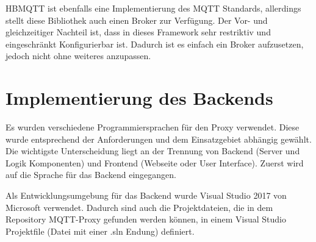     HBMQTT ist ebenfalls eine Implementierung des \ac{MQTT} Standards, allerdings stellt diese Bibliothek auch einen Broker zur Verfügung. Der Vor- und gleichzeitiger Nachteil ist, dass in dieses Framework sehr restriktiv und eingeschränkt Konfigurierbar ist. Dadurch ist es einfach ein Broker aufzusetzen, jedoch nicht ohne weiteres anzupassen.
    \cite{jouanin_2018}
    
\section{Implementierung des Backends}

    Es wurden verschiedene Programmiersprachen für den Proxy verwendet. Diese wurde entsprechend der Anforderungen und dem Einsatzgebiet abhängig gewählt.
    Die wichtigste Unterscheidung liegt an der Trennung von Backend (Server und Logik Komponenten) und Frontend (Webseite oder User Interface).
    Zuerst wird auf die Sprache für das Backend eingegangen.
    
    Als Entwicklungsumgebung für das Backend wurde Visual Studio 2017 \cite{microsoft_2019} von Microsoft verwendet. Dadurch sind auch die Projektdateien, die in dem Repository \glqq MQTT-Proxy\grqq{} \cite{eisenschmidt_2019} gefunden werden können, in einem Visual Studio Projektfile (Datei mit einer .sln Endung) definiert.
    
